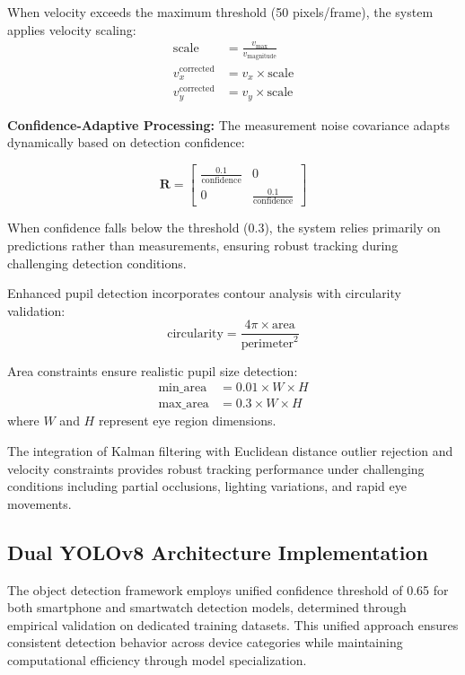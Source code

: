 \documentclass[conference]{IEEEtran}
\begin{document}
When velocity exceeds the maximum threshold (50 pixels/frame), the system applies velocity scaling:
\begin{align}
\text{scale} &= \frac{v_{\text{max}}}{v_{\text{magnitude}}} \\
v_x^{\text{corrected}} &= v_x \times \text{scale} \\
v_y^{\text{corrected}} &= v_y \times \text{scale}
\end{align}

\textbf{Confidence-Adaptive Processing:} The measurement noise covariance adapts dynamically based on detection confidence:

\begin{equation}
\mathbf{R} = \begin{bmatrix}
\frac{0.1}{\text{confidence}} & 0 \\
0 & \frac{0.1}{\text{confidence}}
\end{bmatrix}
\end{equation}

When confidence falls below the threshold (0.3), the system relies primarily on predictions rather than measurements, ensuring robust tracking during challenging detection conditions.

Enhanced pupil detection incorporates contour analysis with circularity validation:
\begin{equation}
\text{circularity} = \frac{4\pi \times \text{area}}{\text{perimeter}^2}
\end{equation}

Area constraints ensure realistic pupil size detection:
\begin{align}
\text{min\_area} &= 0.01 \times W \times H \\
\text{max\_area} &= 0.3 \times W \times H
\end{align}
where $W$ and $H$ represent eye region dimensions.

The integration of Kalman filtering with Euclidean distance outlier rejection and velocity constraints provides robust tracking performance under challenging conditions including partial occlusions, lighting variations, and rapid eye movements\cite{li2003survey}.

\subsection{Dual YOLOv8 Architecture Implementation}

The object detection framework employs unified confidence threshold of 0.65 for both smartphone and smartwatch detection models, determined through empirical validation on dedicated training datasets. This unified approach ensures consistent detection behavior across device categories while maintaining computational efficiency through model specialization.
\end{document}
